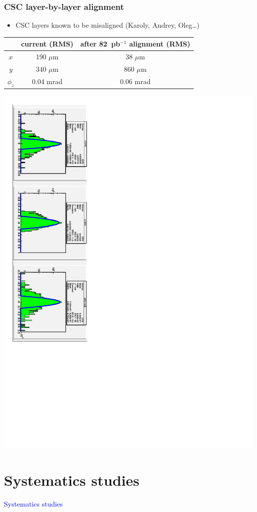 \documentclass[compress]{beamer}
\begin{document}
\begin{frame}
\frametitle{CSC layer-by-layer alignment}
\begin{itemize}
\item CSC layers known to be misaligned (Karoly, Andrey, Oleg\ldots)
\end{itemize}
\begin{center}
\begin{tabular}{c c c}
& current (RMS) & after 82~pb$^{-1}$ alignment (RMS) \\\hline
$x$ & 190 $\mu$m & 38 $\mu$m \\
$y$ & 340 $\mu$m & 860 $\mu$m \\
$\phi_z$ & 0.04 mrad & 0.06 mrad \\
\end{tabular}
\end{center}
\includegraphics[height=\linewidth, angle=90]{layer_alignment.pdf}
\end{frame}

\section*{Systematics studies}

\begin{frame}
\begin{center}
\Huge \textcolor{blue}{Systematics studies}
\end{center}
\end{frame}
\end{document}

